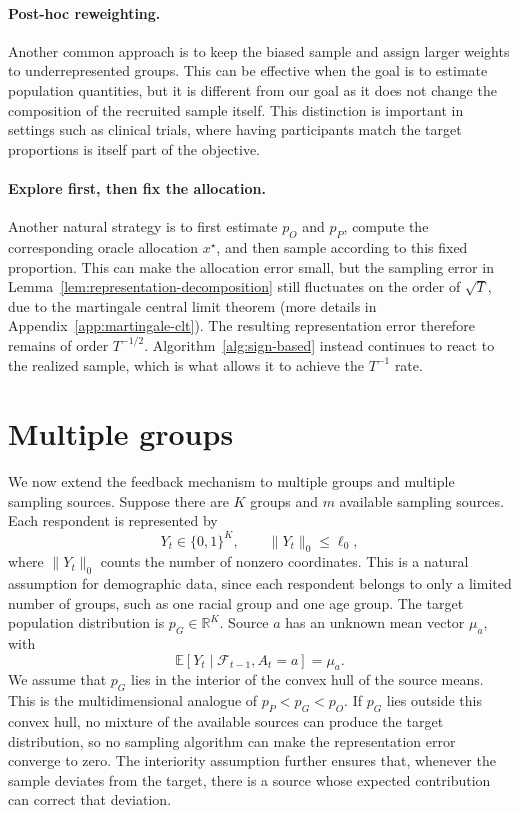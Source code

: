 \documentclass[twoside]{article}
\begin{document}
\paragraph{Post-hoc reweighting.}
Another common approach is to keep the biased sample and assign larger
weights to underrepresented groups. This can be effective when the goal is
to estimate population quantities, but it is different from our goal as it does not change the composition
of the recruited sample itself. This distinction is important in settings
such as clinical trials, where having participants match the target proportions is itself part of the objective. 


\paragraph{Explore first, then fix the allocation.}
Another natural strategy is to first estimate \(p_O\) and \(p_P\), compute the
corresponding oracle allocation \(x^\star\), and then sample according to this
fixed proportion. This can make the allocation error small, but the sampling
error in Lemma~\ref{lem:representation-decomposition} still fluctuates on the
order of \(\sqrt{T}\), due to the martingale central limit theorem (more details in Appendix~\ref{app:martingale-clt}). The resulting representation error therefore remains
of order \(T^{-1/2}\). Algorithm~\ref{alg:sign-based} instead continues to
react to the realized sample, which is what allows it to achieve the
\(T^{-1}\) rate.



\section{Multiple groups}
\label{sec:multi}
We now extend the feedback mechanism to multiple groups and
multiple sampling sources. Suppose there are \(K\) groups
and \(m\) available sampling sources. Each respondent is represented by
\[
Y_t\in\{0,1\}^K,
\qquad
\|Y_t\|_0\le \ell_0,
\]
where \(\|Y_t\|_0\) counts the number of nonzero coordinates. This is a
natural assumption for demographic data, since each respondent belongs
to only a limited number of groups, such as one racial group and one
age group. The target population distribution is \(p_G\in\mathbb R^K\). Source \(a\) has an unknown mean vector \(\mu_a\), with
\[
\mathbb E[Y_t\mid\mathcal F_{t-1},A_t=a]=\mu_a.
\]
We assume that \(p_G\) lies in the interior of the convex hull of the
source means. This is the multidimensional analogue of
\(p_P<p_G<p_O\). If \(p_G\) lies outside this convex hull, no mixture of
the available sources can produce the target distribution, so no sampling
algorithm can make the representation error converge to zero. The
interiority assumption further ensures that, whenever the sample deviates
from the target, there is a source whose expected contribution can
correct that deviation. 
\end{document}
